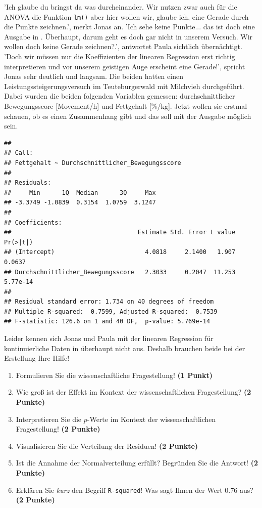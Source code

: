 \documentclass[a4paper, 9pt]{scrartcl}\usepackage[]{graphicx}\usepackage[]{xcolor}
\makeatletter
\newenvironment{kframe}{%
 \def\at@end@of@kframe{}%
 \ifinner\ifhmode%
  \def\at@end@of@kframe{\end{minipage}}%
  \begin{minipage}{\columnwidth}%
 \fi\fi%
 \def\FrameCommand##1{\hskip\@totalleftmargin \hskip-\fboxsep
 \colorbox{shadecolor}{##1}\hskip-\fboxsep
     \hskip-\linewidth \hskip-\@totalleftmargin \hskip\columnwidth}%
 \MakeFramed {\advance\hsize-\width
   \@totalleftmargin\z@ \linewidth\hsize
   \@setminipage}}%
 {\par\unskip\endMakeFramed%
 \at@end@of@kframe}
\newenvironment{knitrout}{}{} %
\makeatother
\begin{document}
'Ich glaube du bringst da was durcheinander. Wir nutzen zwar auch für die ANOVA die Funktion \texttt{lm()} aber hier wollen wir, glaube ich, eine Gerade durch die Punkte zeichnen.', merkt Jonas an. 'Ich sehe keine Punkte... das ist doch eine Ausgabe in \Rlogo. Überhaupt, darum geht es doch gar nicht in unserem Versuch. Wir wollen doch keine Gerade zeichnen?.', antwortet Paula sichtlich übernächtigt. 'Doch wir müssen nur die Koeffizienten der linearen Regression erst richtig interpretieren und vor unserem geistigen Auge erscheint eine Gerade!', spricht Jonas sehr deutlich und langsam. Die beiden hatten einen Leistungssteigerungsversuch im Teuteburgerwald mit Milchvieh durchgeführt. Dabei wurden die beiden folgenden Variablen gemessen: durchschnittlicher Bewegungsscore [Movement/h] und Fettgehalt [\%/kg]. Jetzt wollen sie erstmal schauen, ob es einen Zusammenhang gibt und das soll mit der \Rlogo Ausgabe möglich sein.

\begin{knitrout}
\color{fgcolor}\begin{kframe}
\begin{verbatim}
## 
## Call:
## Fettgehalt ~ Durchschnittlicher_Bewegungsscore
## 
## Residuals:
##     Min      1Q  Median      3Q     Max 
## -3.3749 -1.0839  0.3154  1.0759  3.1247 
## 
## Coefficients:
##                                   Estimate Std. Error t value Pr(>|t|)
## (Intercept)                         4.0818     2.1400   1.907   0.0637
## Durchschnittlicher_Bewegungsscore   2.3033     0.2047  11.253 5.77e-14
## 
## Residual standard error: 1.734 on 40 degrees of freedom
## Multiple R-squared:  0.7599,	Adjusted R-squared:  0.7539 
## F-statistic: 126.6 on 1 and 40 DF,  p-value: 5.769e-14
\end{verbatim}
\end{kframe}
\end{knitrout}

Leider kennen sich Jonas und Paula mit der linearen Regression für kontinuierliche Daten in \Rlogo überhaupt nicht aus. Deshalb brauchen beide bei der Erstellung Ihre Hilfe!


\begin{enumerate}
\item Formulieren Sie die wissenschaftliche Fragestellung! \textbf{(1 Punkt)}
\item Wie groß ist der Effekt im Kontext der wissenschaftlichen Fragestellung? \textbf{(2 Punkte)} 
\item Interpretieren Sie die $p$-Werte im Kontext der wissenschaftlichen Fragestellung! \textbf{(2 Punkte)}
\item Visualisieren Sie die Verteilung der Residuen! \textbf{(2 Punkte)} 
\item Ist die Annahme der Normalverteilung erfüllt? Begründen Sie die Antwort! \textbf{(2 Punkte)}
\item Erklären Sie \textit{kurz} den Begriff \texttt{R-squared}! Was sagt Ihnen der Wert $0.76$ aus? \textbf{(2 Punkte)}
\end{enumerate}
 
\end{document}
